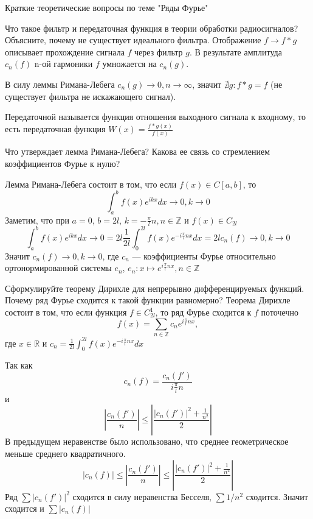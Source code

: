 \documentclass{article}
\begin{document}
\begin{section}{Краткие теоретические вопросы по теме "Ряды Фурье"}
\begin{subsection}{Что такое фильтр и передаточная функция в теории обработки радиосигналов? Объясните, почему не существует идеального фильтра.}
Отображение $f \rightarrow f*g$ описывает прохождение сигнала $f$ через фильтр $g$. 
В результате амплитуда $c_n(f)$ n-ой гармоники $f$ умножается на $c_n(g)$.

В силу леммы Римана-Лебега $c_n(g)\rightarrow 0, n\rightarrow \infty$, значит $\nexists g: f*g=f$ (не существует фильтра не искажающего сигнал).

Передаточной называется функция отношения выходного сигнала к входному, то есть передаточная функция $ W(x) = \frac{f*g(x)}{f(x)} $ 
\end{subsection}


\begin{subsection}{Что утверждает лемма Римана-Лебега? Какова ее связь со стремлением коэффициентов Фурье к нулю?}

Лемма Римана-Лебега состоит в том, что если $f(x)\in C[a,b]$, то
\[\int_a^b f(x)e^{ikx}dx \rightarrow 0, k \rightarrow 0\]
Заметим, что при $a = 0$, $b = 2l$, $k=-\frac{\pi}{l}n, n \in \mathbb{Z}$ и $f(x)\in C_{2l}$ 
\[\int_a^b f(x)e^{ikx}dx \rightarrow 0 = 2l \frac{1}{2l}\int_0^{2l}f(x)e^{-i\frac{\pi}{l}nx}dx = 2lc_n(f) \rightarrow 0, k \rightarrow 0\]
Значит $c_n(f) \rightarrow 0, k \rightarrow 0$, 
где $c_n$ --- коэффициенты Фурье относительно ортонормированной системы ${e_n}$, $e_n: x \mapsto e^{i\frac{\pi}{l}nx}, n \in \mathbb{Z}$
\end{subsection}


\begin{subsection}{Сформулируйте теорему Дирихле для непрерывно дифференцируемых функций. Почему ряд Фурье сходится к такой функции равномерно?}
Теорема Дирихле состоит в том, что если функция $f \in C_{2l}^1$, то ряд Фурье сходится к $f$ поточечно
\[f(x)=\sum_{n \in \mathbb{Z}} c_n e^{i\frac{\pi}{l}nx}, \]
где $x \in \mathbb{R}$ и $c_n = \frac{1}{2l}\int_0^{2l}f(x)e^{-i\frac{\pi}{l}nx}dx$

Так как
\[ c_n(f) = \frac{c_n(f')}{i\frac{\pi}{l}n} \]
и \[ \left| \frac{c_n(f')}{n} \right| \leq \left|\frac{|c_n(f')|^2 + \frac{1}{n^2}}{2}\right|\]
В предыдущем неравенстве было использовано, что среднее геометрическое меньше среднего квадратичного.
\[ |c_n(f)| \leq \left| \frac{c_n(f')}{n} \right| \leq \left|\frac{|c_n(f')|^2 + \frac{1}{n^2}}{2}\right|\] 
Ряд $\sum |c_n(f')|^2$ сходится в силу неравенства Бесселя, $\sum 1/n^2$ сходится. Значит сходится и $\sum |c_n(f)|$ 
\end{subsection}



\end{section}
\end{document}
